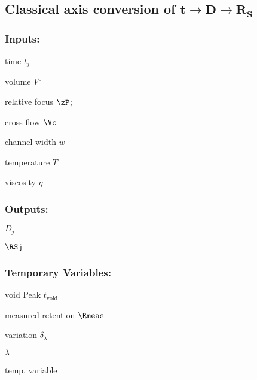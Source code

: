 \subsection*{Classical axis conversion of $\bm{t \longrightarrow D \longrightarrow R_S } $}

\subsubsection*{Inputs:}
\begin{multicols}{3}
  \begin{packed_item}
  \item time $t_j$
  \item volume $V^0$
  \item relative focus $\zP$;
  \item cross flow $\Vc$
  \item channel width $w$
  \item temperature $T$
  \item viscosity $\eta$    
  \end{packed_item}
\end{multicols}

\subsubsection*{Outputs:}
\begin{multicols}{3}
  \begin{packed_item}
  \item  $D_{j}$
  \item $\RSj$
  \end{packed_item}
\end{multicols}

\subsubsection*{Temporary Variables:}
\begin{multicols}{3}
  \begin{packed_item}
  \item void Peak $t_\mathrm{void}$
  \item measured retention $\Rmeas$
  \item variation $δ_λ$
  \item $\lambda$
  \item temp. variable 
  \end{packed_item}
\end{multicols}
